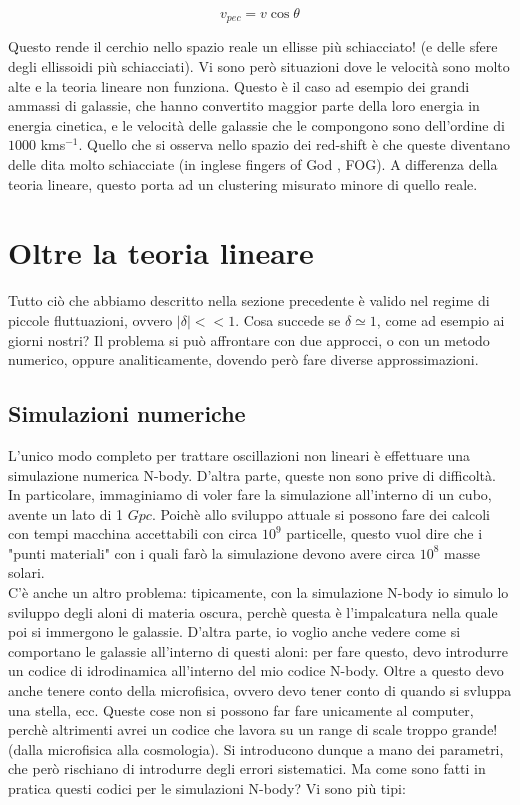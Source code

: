 \documentclass{report}
\begin{document}
\begin{equation}
    v_{pec} = v\cos \theta
\end{equation}

Questo rende il cerchio nello spazio reale un ellisse più schiacciato! (e delle sfere degli ellissoidi più schiacciati). Vi sono però situazioni dove le velocità sono molto alte e la teoria lineare non funziona. Questo è il caso ad esempio dei grandi ammassi di galassie, che hanno convertito maggior parte della loro energia in energia cinetica, e le velocità delle galassie che le compongono sono dell'ordine di $1000$ kms$^{-1}$. Quello che si osserva nello spazio dei red-shift è che queste diventano delle dita molto schiacciate (in inglese fingers of God , FOG). A differenza della teoria lineare, questo porta ad un clustering misurato minore di quello reale.  

\newpage
\chapter{Oltre la teoria lineare}

Tutto ciò che abbiamo descritto nella sezione precedente è valido nel regime di piccole fluttuazioni, ovvero $|\delta| << 1$. Cosa succede se $\delta \simeq 1$, come ad esempio ai giorni nostri? Il problema si può affrontare con due approcci, o con un metodo numerico, oppure analiticamente, dovendo però fare diverse approssimazioni. 

\section{Simulazioni numeriche}
    L'unico modo completo per trattare oscillazioni non lineari è effettuare una simulazione numerica N-body. D'altra parte, queste non sono prive di difficoltà. In particolare, immaginiamo di voler fare la simulazione all'interno di un cubo, avente un lato di 1 $Gpc$. Poichè allo sviluppo attuale si possono fare dei calcoli con tempi macchina accettabili con circa $10^9$ particelle, questo vuol dire che i "punti materiali" con i quali farò la simulazione devono avere circa $10^8$ masse solari. \\
    C'è anche un altro problema: tipicamente, con la simulazione N-body io simulo lo sviluppo degli aloni di materia oscura, perchè questa è l'impalcatura nella quale poi si immergono le galassie. D'altra parte, io voglio anche vedere come si comportano le galassie all'interno di questi aloni: per fare questo, devo introdurre un codice di idrodinamica all'interno del mio codice N-body. Oltre a questo devo anche tenere conto della microfisica, ovvero devo tener conto di quando si svluppa una stella, ecc. Queste cose non si possono far fare unicamente al computer, perchè altrimenti avrei un codice che lavora su un range di scale troppo grande! (dalla microfisica alla cosmologia). Si introducono dunque a mano dei parametri, che però rischiano di introdurre degli errori sistematici. Ma come sono fatti in pratica questi codici per le simulazioni N-body? Vi sono più tipi: 
\end{document}
